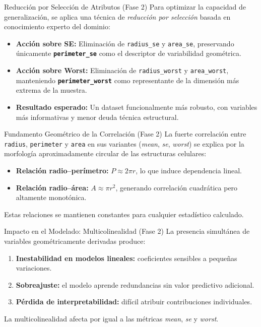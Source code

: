 \documentclass{beamer}
\begin{document}
	\begin{frame}{Reducción por Selección de Atributos (Fase 2)}
		Para optimizar la capacidad de generalización, se aplica una técnica de \textit{reducción por selección} basada en conocimiento experto del dominio:
		
		\begin{itemize}
			\item<2-> \textbf{Acción sobre SE:} Eliminación de \texttt{radius\_se} y \texttt{area\_se}, preservando únicamente \textbf{\texttt{perimeter\_se}} como el descriptor de variabilidad geométrica.
			\item<3-> \textbf{Acción sobre Worst:} Eliminación de \texttt{radius\_worst} y \texttt{area\_worst}, manteniendo \textbf{\texttt{perimeter\_worst}} como representante de la dimensión más extrema de la muestra.
			\item<4-> \textbf{Resultado esperado:} Un dataset funcionalmente más robusto, con variables más informativas y menor deuda técnica estructural.
		\end{itemize}
	\end{frame}
	
	\begin{frame}{Fundamento Geométrico de la Correlación (Fase 2)}
		La fuerte correlación entre \texttt{radius}, \texttt{perimeter} y \texttt{area} en sus variantes (\textit{mean}, \textit{se}, \textit{worst}) se explica por la morfología aproximadamente circular de las estructuras celulares:
		
		\begin{itemize}
			\item<2-> \textbf{Relación radio–perímetro:} $P \approx 2\pi r$, lo que induce dependencia lineal.
			\item<3-> \textbf{Relación radio–área:} $A \approx \pi r^2$, generando correlación cuadrática pero altamente monotónica.
		\end{itemize}
		
		Estas relaciones se mantienen constantes para cualquier estadístico calculado.
	\end{frame}
	
	
	\begin{frame}{Impacto en el Modelado: Multicolinealidad (Fase 2)}
		La presencia simultánea de variables geométricamente derivadas produce:
		
		\begin{enumerate}
			\item<2-> \textbf{Inestabilidad en modelos lineales:} coeficientes sensibles a pequeñas variaciones.
			\item<3-> \textbf{Sobreajuste:} el modelo aprende redundancias sin valor predictivo adicional.
			\item<4-> \textbf{Pérdida de interpretabilidad:} difícil atribuir contribuciones individuales.
		\end{enumerate}
		
		La multicolinealidad afecta por igual a las métricas \textit{mean}, \textit{se} y \textit{worst}.
	\end{frame}
	
\end{document}
